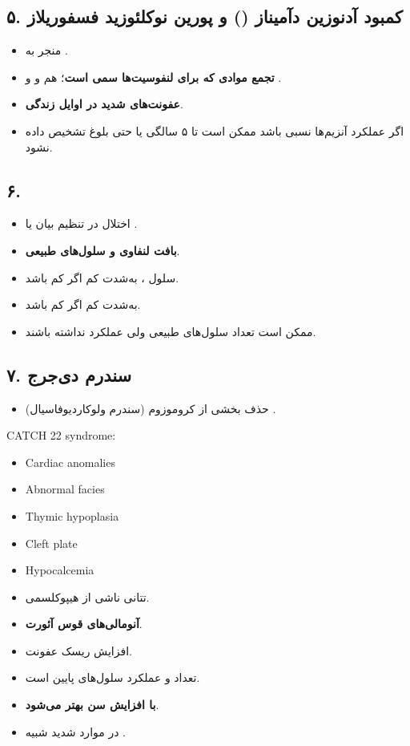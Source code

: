 \documentclass[12pt,a4paper]{article}
\begin{document}
\subsection*{۵. کمبود آدنوزین دآمیناز () و پورین نوکلئوزید فسفوریلاز}
\begin{itemize}
\item منجر به .
\item \textbf{تجمع موادی که برای لنفوسیت‌ها سمی است}؛ هم  و  و .
\item \textbf{عفونت‌های شدید در اوایل زندگی}.
\item اگر عملکرد آنزیم‌ها نسبی باشد ممکن است تا ۵ سالگی یا حتی بلوغ تشخیص داده نشود.
\end{itemize}

\subsection*{۶. }
\begin{itemize}
\item اختلال در تنظیم بیان  یا .
\item \textbf{بافت لنفاوی و سلول‌های  طبیعی}.
\item سلول ،  به‌شدت کم \LDarrow{} اگر  کم باشد.
\item {} به‌شدت کم \LDarrow{} اگر  کم باشد.
\item ممکن است تعداد سلول‌های  طبیعی ولی عملکرد نداشته باشند.
\end{itemize}

\subsection*{۷. سندرم دی‌جرج}
\begin{itemize}
\item (سندرم ولوکاردیوفاسیال) \LDarrow{} حذف بخشی از کروموزوم .
\end{itemize}
\begin{latin}
CATCH 22 syndrome:
\begin{itemize}
\item Cardiac anomalies
\item Abnormal facies
\item Thymic hypoplasia
\item Cleft plate
\item Hypocalcemia
\end{itemize}
\end{latin}
\begin{itemize}
\item تتانی ناشی از هیپوکلسمی.
\item \textbf{آنومالی‌های قوس آئورت}.
\item افزایش ریسک عفونت.
\item تعداد و عملکرد سلول‌های  پایین است.
\item \textbf{با افزایش سن بهتر می‌شود}.
\item در موارد شدید شبیه .
\end{itemize}
\end{document}

